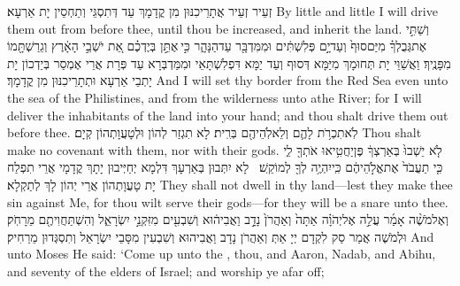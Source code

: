{זְעֵיר זְעֵיר אֲתָרֵיכִנּוּן מִן קֳדָמָךְ עַד דְּתִסְגֵּי וְתַחְסֵין יָת אַרְעָא׃}
{By little and little I will drive them out from before thee, until thou be increased, and inherit the land.}{}
{וְשַׁתִּ֣י אֶת\maqqaf גְּבֻלְךָ֗ מִיַּם\maqqaf סוּף֙ וְעַד\maqqaf יָ֣ם פְּלִשְׁתִּ֔ים וּמִמִּדְבָּ֖ר עַד\maqqaf הַנָּהָ֑ר כִּ֣י \legarmeh  אֶתֵּ֣ן בְּיֶדְכֶ֗ם אֵ֚ת יֹשְׁבֵ֣י הָאָ֔רֶץ וְגֵרַשְׁתָּ֖מוֹ מִפָּנֶֽיךָ׃}
{וַאֲשַׁוֵּי יָת תְּחוּמָךְ מִיַּמָּא דְּסוּף וְעַד יַמָּא דִּפְלִשְׁתָּאֵי וּמִמַּדְבְּרָא עַד פְּרָת אֲרֵי אֶמְסַר בְּיַדְכוֹן יָת יָתְבֵי אַרְעָא וּתְתָרֵיכִנּוּן מִן קֳדָמָךְ׃}
{And I will set thy border from the Red Sea even unto the sea of the Philistines, and from the wilderness unto athe River; for I will deliver the inhabitants of the land into your hand; and thou shalt drive them out before thee.}{}
{לֹֽא\maqqaf תִכְרֹ֥ת לָהֶ֛ם וְלֵאלֹֽהֵיהֶ֖ם בְּרִֽית׃}
{לָא תִגְזַר לְהוֹן וּלְטָעֲוָתְהוֹן קְיָם׃}
{Thou shalt make no covenant with them, nor with their gods.}{}
{לֹ֤א יֵשְׁבוּ֙ בְּאַרְצְךָ֔ פֶּן\maqqaf יַחֲטִ֥יאוּ אֹתְךָ֖ לִ֑י כִּ֤י תַעֲבֹד֙ אֶת\maqqaf אֱלֹ֣הֵיהֶ֔ם כִּֽי\maqqaf יִהְיֶ֥ה לְךָ֖ לְמוֹקֵֽשׁ׃ \petucha }
{לָא יִתְּבוּן בְּאַרְעָךְ דִּלְמָא יְחַיְּיבוּן יָתָךְ קֳדָמָי אֲרֵי תִפְלַח יָת טָעֲוָתְהוֹן אֲרֵי יְהוֹן לָךְ לְתַקְלָא׃}
{They shall not dwell in thy land—lest they make thee sin against Me, for thou wilt serve their gods—for they will be a snare unto thee.}{}
\newperek
{}%
{וְאֶל\maqqaf מֹשֶׁ֨ה אָמַ֜ר עֲלֵ֣ה אֶל\maqqaf יְהֹוָ֗ה אַתָּה֙ וְאַהֲרֹן֙ נָדָ֣ב וַאֲבִיה֔וּא וְשִׁבְעִ֖ים מִזִּקְנֵ֣י יִשְׂרָאֵ֑ל וְהִשְׁתַּחֲוִיתֶ֖ם מֵרָחֹֽק׃}
{וּלְמֹשֶׁה אֲמַר סַק לִקְדָם יְיָ אַתְּ וְאַהֲרֹן נָדָב וַאֲבִיהוּא וְשִׁבְעִין מִסָּבֵי יִשְׂרָאֵל וְתִסְגְּדוּן מֵרַחִיק׃}
{And unto Moses He said: ‘Come up unto the \lord, thou, and Aaron, Nadab, and Abihu, and seventy of the elders of Israel; and worship ye afar off;}{}
